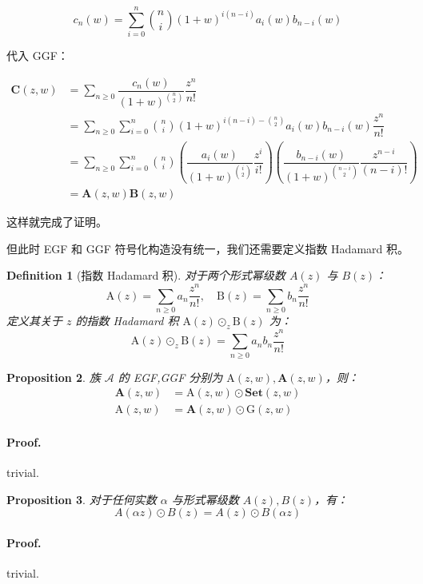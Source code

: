 \documentclass[10pt,a4paper,oneside]{article}
\newtheorem{definition}{Definition}[section]
\newtheorem{proposition}[definition]{Proposition}
\begin{document}
\[
c_n(w) = \sum_{i=0}^n \binom{n}{i} (1+w)^{i(n-i)}a_i(w)b_{n-i}(w)
\]

代入 GGF：

\[\begin{aligned}
\mathbf{C}(z,w) &= \sum_{n\ge 0} \dfrac{c_n(w)}{(1+w)^{\binom n2}}\dfrac{z^n}{n!}\\
&= \sum_{n\ge 0} \sum_{i=0}^n \binom{n}{i} (1+w)^{i(n-i)-\binom n2}a_i(w)b_{n-i}(w) \dfrac{z^n}{n!}\\
&= \sum_{n\ge 0} \sum_{i=0}^n \binom{n}{i} \left(\dfrac{a_i(w)}{(1+w)^{\binom i2}}\dfrac{z^i}{i!}\right)\left( \dfrac{b_{n-i}(w)}{(1+w)^{\binom {n-i}2}}\dfrac{z^{n-i}}{(n-i)!} \right)\\
&= \mathbf{A}(z,w)\mathbf{B}(z,w)
\end{aligned}\]

这样就完成了证明。

但此时 EGF 和 GGF 符号化构造没有统一，我们还需要定义指数 Hadamard 积。

\begin{definition}[指数 Hadamard 积]
    对于两个形式幂级数 $A(z)$ 与 $B(z)$：
    \[\mathrm A(z) = \sum_{n\ge 0} a_n\dfrac{z^n}{n!},\quad \mathrm B(z) = \sum_{n\ge 0} b_n\dfrac{z^n}{n!}\]
    定义其关于 $z$ 的指数 Hadamard 积 $\mathrm A(z) \odot_z \mathrm B(z)$ 为：
    \[\mathrm A(z) \odot_z \mathrm B(z) = \sum_{n\ge 0} a_nb_n\dfrac{z^n}{n!}\]
\end{definition}


\begin{proposition}
    族 $\mathcal{A}$ 的 EGF,GGF 分别为 $\mathrm A(z,w), \mathbf{A}(z,w)$，则：
    \[\begin{aligned}
\mathbf{A}(z,w) &= \mathrm A(z,w) \odot \mathbf{Set}(z,w)\\
\mathrm A(z,w) &= \mathbf{A}(z,w) \odot \mathrm G(z,w)
\end{aligned}\]
\end{proposition}

\paragraph{Proof.} trivial.

\begin{proposition}
    对于任何实数 $\alpha$ 与形式幂级数 $A(z),B(z)$，有：
    \[A(\alpha z) \odot B(z) = A(z) \odot B(\alpha z)\]
\end{proposition}

\paragraph{Proof.} trivial.
\end{document}
